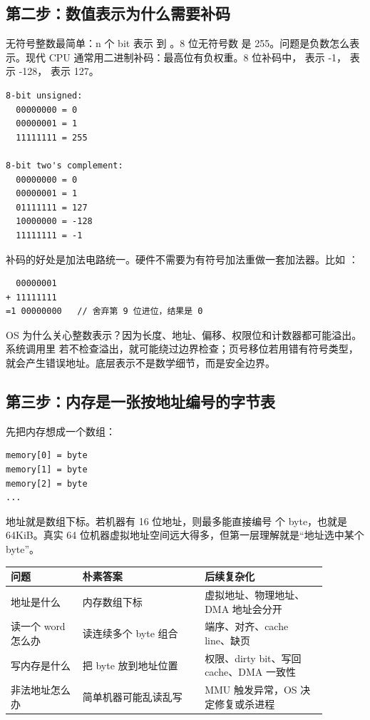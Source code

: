 \subsection{第二步：数值表示为什么需要补码}

无符号整数最简单：n 个 bit 表示  到 。8 位无符号数  是 255。问题是负数怎么表示。现代 CPU 通常用二进制补码：最高位有负权重。8 位补码中， 表示 -1， 表示 -128， 表示 127。

\begin{lstlisting}
8-bit unsigned:
  00000000 = 0
  00000001 = 1
  11111111 = 255

8-bit two's complement:
  00000000 = 0
  00000001 = 1
  01111111 = 127
  10000000 = -128
  11111111 = -1
\end{lstlisting}

补码的好处是加法电路统一。硬件不需要为有符号加法重做一套加法器。比如 ：

\begin{lstlisting}
  00000001
+ 11111111
=1 00000000   // 舍弃第 9 位进位，结果是 0
\end{lstlisting}

OS 为什么关心整数表示？因为长度、地址、偏移、权限位和计数器都可能溢出。系统调用里  若不检查溢出，就可能绕过边界检查；页号移位若用错有符号类型，就会产生错误地址。底层表示不是数学细节，而是安全边界。

\subsection{第三步：内存是一张按地址编号的字节表}

先把内存想成一个数组：

\begin{lstlisting}
memory[0] = byte
memory[1] = byte
memory[2] = byte
...
\end{lstlisting}

地址就是数组下标。若机器有 16 位地址，则最多能直接编号  个 byte，也就是 64KiB。真实 64 位机器虚拟地址空间远大得多，但第一层理解就是“地址选中某个 byte”。

\begin{longtable}{p{0.2\linewidth}p{0.34\linewidth}p{0.34\linewidth}}
\toprule
问题 & 朴素答案 & 后续复杂化 \\
\midrule
地址是什么 & 内存数组下标 & 虚拟地址、物理地址、DMA 地址会分开 \\
读一个 word 怎么办 & 读连续多个 byte 组合 & 端序、对齐、cache line、缺页 \\
写内存是什么 & 把 byte 放到地址位置 & 权限、dirty bit、写回 cache、DMA 一致性 \\
非法地址怎么办 & 简单机器可能乱读乱写 & MMU 触发异常，OS 决定修复或杀进程 \\
\bottomrule
\end{longtable}


